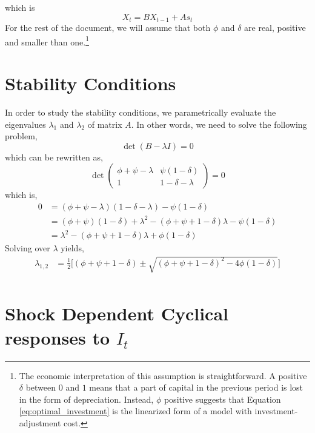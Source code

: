 \documentclass{article}
\begin{document}
which is
\begin{equation}\label{eq:matrix_system_compact}
X_t = B X_{t-1} + A s_t
\end{equation}
For the rest of the document, we will assume that both $\phi$ and $\delta$ are real, positive and smaller than one.\footnote{The economic interpretation of this assumption is straightforward. A positive $\delta$ between $0$ and $1$ means that a part of capital in the previous period is lost in the form of depreciation. Instead, $\phi$ positive suggests that Equation \ref{eq:optimal_investment} is the linearized form of a model with investment-adjustment cost.}

\section{Stability Conditions}

In order to study the stability conditions, we parametrically evaluate the eigenvalues $\lambda_1$ and $\lambda_2$ of matrix $A$. In other words, we need to solve the following problem,
$$
\det(B - \lambda I) = 0
$$
which can be rewritten as,
$$
\det \begin{pmatrix}
\phi + \psi - \lambda & \psi (1 - \delta) \\
1 & 1 - \delta - \lambda
\end{pmatrix} = 0
$$
which is, 
\begin{equation*}
\begin{aligned}
  0 &= (\phi + \psi - \lambda)(1 - \delta - \lambda) - \psi (1 - \delta) \\
  &= (\phi + \psi) (1 - \delta) + \lambda^2 - (\phi + \psi + 1 - \delta) \lambda - \psi (1 - \delta) \\
   &= \lambda^2  - (\phi + \psi + 1 - \delta) \lambda  + \phi  (1 - \delta)
\end{aligned}
\end{equation*}
Solving over $\lambda$ yields,
\begin{equation}\label{eq:lambda_sol}
\begin{aligned}
\lambda_{1,2} &= \frac{1}{2} \bigg[ (\phi + \psi + 1 - \delta)  \pm \sqrt{  (\phi + \psi + 1 - \delta)^2 - 4\phi  (1 - \delta) }  \bigg] \\
\end{aligned}
\end{equation}




\section{Shock Dependent Cyclical responses to $I_t$}
\end{document}
